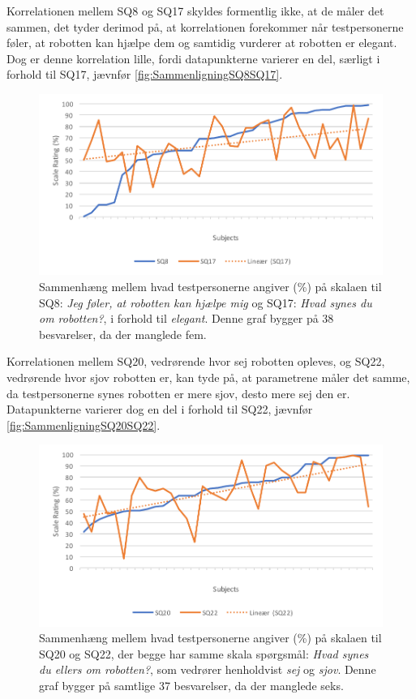 \noindent
%
Korrelationen mellem SQ8 og SQ17 skyldes formentlig ikke, at de måler det sammen, det tyder derimod på, at korrelationen forekommer når testpersonerne føler, at robotten kan hjælpe dem og samtidig vurderer at robotten er elegant. Dog er denne korrelation lille, fordi datapunkterne varierer en del, særligt i forhold til SQ17, jævnfør \autoref{fig:SammenligningSQ8SQ17}. 
\newpage 
%
\begin{figure}[H]
	\centering
	\includegraphics[width=\textwidth]{Figure/Korrelationsgrafer/SQ8+SQ17}
	\caption{Sammenhæng mellem hvad testpersonerne angiver (\%) på skalaen til SQ8: \textit{Jeg føler, at robotten kan hjælpe mig} og SQ17: \textit{Hvad synes du om robotten?}, i forhold til \textit{elegant}. Denne graf bygger på 38 besvarelser, da der manglede fem.}
	\label{fig:SammenligningSQ8SQ17}
\end{figure}
\noindent
%
Korrelationen mellem SQ20, vedrørende hvor sej robotten opleves, og SQ22, vedrørende hvor sjov robotten er, kan tyde på, at parametrene måler det samme, da testpersonerne synes robotten er mere sjov, desto mere sej den er. Datapunkterne varierer dog en del i forhold til SQ22, jævnfør \autoref{fig:SammenligningSQ20SQ22}.  
%
\begin{figure}[H]
	\centering
	\includegraphics[width=\textwidth]{Figure/Korrelationsgrafer/SQ20+SQ22}
	\caption{Sammenhæng mellem hvad testpersonerne angiver (\%) på skalaen til SQ20 og SQ22, der begge har samme skala spørgsmål: \textit{Hvad synes du ellers om robotten?}, som vedrører henholdvist \textit{sej} og \textit{sjov}. Denne graf bygger på samtlige 37 besvarelser, da der manglede seks.}
	\label{fig:SammenligningSQ20SQ22}
\end{figure}
